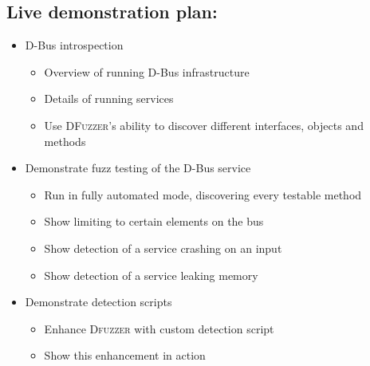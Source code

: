 \documentclass[conference]{IEEEtran}
\begin{document}
\begin{appendices}

  \section{Live demonstration plan:}
\begin{itemize}
	\item D-Bus introspection
		\begin{itemize}
			\item Overview of running D-Bus infrastructure
			\item Details of running services
			\item Use \textsc{DFuzzer}'s ability to discover different interfaces, objects and
			methods
		\end{itemize}
	\item Demonstrate fuzz testing of the D-Bus service
		\begin{itemize}
			\item Run in fully automated mode, discovering every testable method
			\item Show limiting to certain elements on the bus
			\item Show detection of a service crashing on an input
			\item Show detection of a service leaking memory
		\end{itemize}
	\item Demonstrate detection scripts
		\begin{itemize}
			\item Enhance \textsc{Dfuzzer} with custom detection script
			\item Show this enhancement in action
		\end{itemize}
\end{itemize}
\end{appendices}
\end{document}
